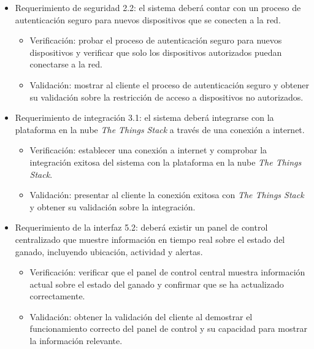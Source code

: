 \documentclass[
11pt, %
]{charter}
\begin{document}
\begin{itemize}
\item Requerimiento de seguridad 2.2: el sistema deberá contar con un proceso de autenticación seguro para nuevos dispositivos que se conecten a la red.
\begin{itemize}
\item Verificación: probar el proceso de autenticación seguro para nuevos dispositivos y verificar que solo los dispositivos autorizados puedan conectarse a la red.
\item Validación: mostrar al cliente el proceso de autenticación seguro y obtener su validación sobre la restricción de acceso a dispositivos no autorizados.
\end{itemize}
\end{itemize}

\begin{itemize}
\item Requerimiento de integración 3.1: el sistema deberá integrarse con la plataforma en la nube \emph{The Things Stack} a través
de una conexión a internet.
\begin{itemize}
\item Verificación: establecer una conexión a internet y comprobar la integración exitosa del sistema con la plataforma en la nube \emph{The Things Stack}.
\item Validación: presentar al cliente la conexión exitosa con \emph{The Things Stack} y obtener su validación sobre la integración.
\end{itemize}
\end{itemize}

\begin{itemize}
\item Requerimiento de la interfaz 5.2: deberá existir un panel de control centralizado que muestre información en tiempo real sobre el estado del ganado, incluyendo ubicación, actividad y alertas.
\begin{itemize}
\item Verificación: verificar que el panel de control central muestra información actual sobre el estado del ganado y confirmar que se ha actualizado correctamente.
\item Validación: obtener la validación del cliente al demostrar el funcionamiento correcto del panel de control y su capacidad para mostrar la información relevante.
\end{itemize}
\end{itemize}
\end{document}
